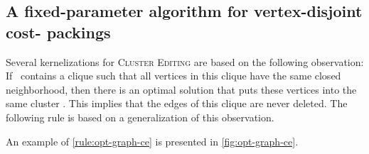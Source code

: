 \documentclass[envcountsame,numbook,smallextended]{svjour3}
\numberwithin{equation}{section}
\numberwithin{figure}{section}
\begin{document}
\subsection{A fixed-parameter algorithm for vertex-disjoint cost- packings}
\label{sec:cet}
Several kernelizations for \textsc{Cluster Editing}
are based on the following observation:
If ~contains a clique
such that all vertices in this clique
have the same closed neighborhood,
then there is an optimal solution that
puts these vertices into the same cluster
\cite{PSS09,Guo09,CM12}.
This implies that the edges of this clique
are never deleted.
The following rule
is based on a generalization of this observation.
An example of \cref{rule:opt-graph-ce} is presented
in \cref{fig:opt-graph-ce}.
\end{document}
